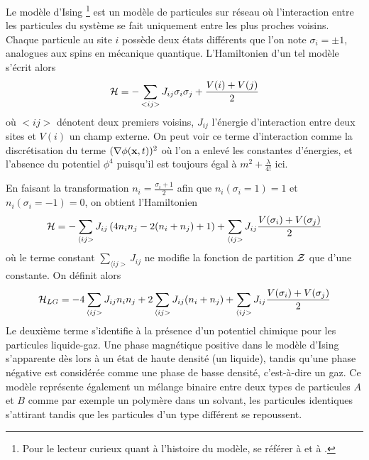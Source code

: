   	Le modèle d'Ising \footnote{Pour le lecteur curieux quant à l'histoire du modèle, se référer à \cite{niss_history_2005} et à \cite{niss_history_2009}.} est un modèle de particules sur réseau où l'interaction entre les particules du système se fait uniquement entre les plus proches voisins. Chaque particule au site $i$ possède deux états différents que l'on note $\sigma_i = \pm 1$, analogues aux spins en mécanique quantique. L'Hamiltonien d'un tel modèle s'écrit alors
\begin{equation}
	\mathcal{H} =  - \sum_{<i j >} J_{ij} \sigma_i \sigma_j + \frac{V(i)+V(j)}{2}
	\label{hamil-ising}
\end{equation}
où $< ij >$ dénotent deux premiers voisins, $J_{ij}$ l'énergie d'interaction entre deux sites et $V(i)$ un champ externe. On peut voir ce terme d'interaction comme la discrétisation du terme $(\nabla \phi({\bf x},t))^2$ où l'on a enlevé les constantes d'énergies, et l'absence du potentiel $\phi^4$ puisqu'il est toujours égal à $m^2+\frac{\lambda}{4!}$ ici. 

En faisant la transformation\cite{goldenfeld_lectures_2018} $n_i =  \frac{\sigma_i +1}{2}$ afin que $n_i(\sigma_i = 1) = 1$ et $n_i(\sigma_i = -1) = 0$, on obtient l'Hamiltonien
\begin{equation}
	\mathcal{H} =  - \sum_{\langle i j >}  J_{ij} \left( 4 n_i n_j -2 ( n_i+n_j) + 1 \right)+ \sum_{\langle i j >}  J_{ij} \frac{V(\sigma_i)+V(\sigma_j)}{2}  
\end{equation}
où le terme constant $\sum_{\langle i j >}  J_{ij}$ ne modifie la fonction de partition $\mathcal{Z}$ que d'une constante. On définit alors 
\begin{equation}
	\mathcal{H}_{LG} =  - 4 \sum_{\langle i j >}  J_{ij}  n_i n_j  + 2 \sum_{\langle i j >}  J_{ij}  (n_i+n_j) + \sum_{\langle i j >}  J_{ij} \frac{V(\sigma_i)+V(\sigma_j)}{2}  
\end{equation}
Le deuxième terme s'identifie à la présence d'un potentiel chimique pour les particules liquide-gaz. Une phase magnétique positive dans le modèle d'Ising s'apparente dès lors à un état de haute densité (un liquide), tandis qu'une phase négative est considérée comme une phase de basse densité, c'est-à-dire un gaz.
Ce modèle représente également un mélange binaire entre deux types de particules $A$ et $B$ comme par exemple un polymère dans un solvant, les particules identiques s'attirant tandis que les particules d'un type différent se repoussent. 

